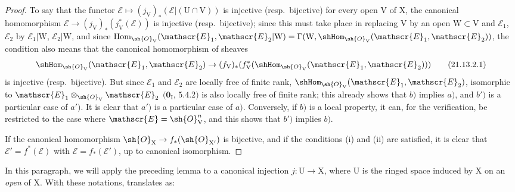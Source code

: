 \begin{proof}
To say that the functor $\mathscr{E}\mapsto(j_{\mathrm{V}})_*(\mathscr{E}|(\mathrm{U}\cap\mathrm{V}))$ is injective (resp.\ bijective) for every open $\mathrm{V}$ of $\mathrm{X}$, the canonical homomorphism $\mathscr{E}\to(j_{\mathrm{V}})_*(j_{\mathrm{V}}^*(\mathscr{E}))$ is injective (resp.\ bijective); since this must take place in replacing $\mathrm{V}$ by an open $\mathrm{W}\subset\mathrm{V}$ and $\mathscr{E}_1$, $\mathscr{E}_2$ by $\mathscr{E}_1|\mathrm{W}$, $\mathscr{E}_2|\mathrm{W}$, and since $\operatorname{Hom}_{\sh{O}_{\mathrm{V}}}(\mathscr{E}_1,\mathscr{E}_2|\mathrm{W})=\Gamma(\mathrm{W},\shHom_{\sh{O}_{\mathrm{V}}}(\mathscr{E}_1,\mathscr{E}_2))$, the condition also means that the canonical homomorphism of sheaves
\[
\label{IV.21.13.2.1}
  \shHom_{\sh{O}_{\mathrm{V}}}(\mathscr{E}_1,\mathscr{E}_2)\to(f_{\mathrm{V}})_*(f_{\mathrm{V}}^*(\shHom_{\sh{O}_{\mathrm{V}}}(\mathscr{E}_1,\mathscr{E}_2)))
  \tag{21.13.2.1}
\]
is injective (resp.\ bijective).
But since $\mathscr{E}_1$ and $\mathscr{E}_2$ are locally free of finite rank, $\shHom_{\sh{O}_{\mathrm{V}}}(\mathscr{E}_1,\mathscr{E}_2)$, isomorphic to $\mathscr{E}_1\otimes_{\sh{O}_{\mathrm{V}}}\mathscr{E}_2$ $(\mathbf{0}_{\mathrm{I}}$, $5.4.2)$ is also locally free of finite rank; this already shows that $b)$ implies $a)$, and $b')$ is a particular case of $a')$.
It is clear that $a')$ is a particular case of $a)$.
Conversely, if $b)$ is a local property, it can, for the verification, be restricted to the case where $\mathscr{E}=\sh{O}_{\mathrm{V}}^n$, and this shows that $b')$ implies $b)$.

If the canonical homomorphism $\sh{O}_{\mathrm{X}}\to f_*(\sh{O}_{\mathrm{X}'})$ is bijective, and if the conditions (i) and (ii) are satisfied, it is clear that $\mathscr{E}'=f^*(\mathscr{E})$ with $\mathscr{E}=f_*(\mathscr{E}')$, up to canonical isomorphism.
\end{proof}

In this paragraph, we will apply the preceding lemma to a canonical injection $j:\mathrm{U}\to\mathrm{X}$, where $\mathrm{U}$ is the ringed space induced by $\mathrm{X}$ on an \emph{open} of $\mathrm{X}$.
With these notations,  translates as:


